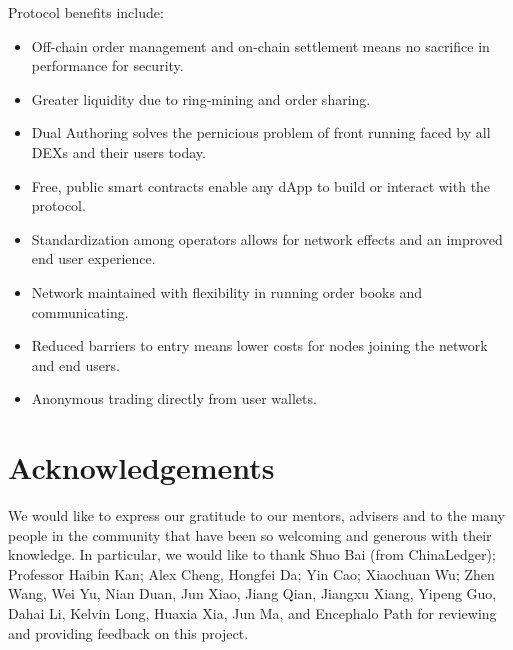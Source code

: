 \documentclass[UTF8,nofonts]{article}
\begin{document}
\begin{multicols}{2}
Protocol benefits include:

\begin{itemize}
	\item Off-chain order management and on-chain settlement means no sacrifice in performance for security.
	\item Greater liquidity due to ring-mining and order sharing.
	\item Dual Authoring solves the pernicious problem of front running faced by all DEXs and their users today.
	\item Free, public smart contracts enable any dApp to build or interact with the protocol.
	\item Standardization among operators allows for network effects and an improved end user experience.
	\item Network maintained with flexibility in running order books and communicating.
	\item Reduced barriers to entry means lower costs for nodes joining the network and end users.
	\item Anonymous trading directly from user wallets.
\end{itemize}

\section{Acknowledgements}
We would like to express our gratitude to our mentors, advisers and to the many people in the community that have been so welcoming and generous with their knowledge. In particular, we would like to thank Shuo Bai (from ChinaLedger); Professor Haibin Kan; Alex Cheng, Hongfei Da; Yin Cao; Xiaochuan Wu; Zhen Wang, Wei Yu, Nian Duan, Jun Xiao, Jiang Qian, Jiangxu Xiang, Yipeng Guo, Dahai Li, Kelvin Long, Huaxia Xia, Jun Ma, and Encephalo Path for reviewing and providing feedback on this project. 






\end{multicols}
\end{document}
